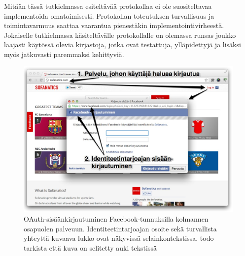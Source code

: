 \documentclass[finnish,gradu]{tktltiki}
\begin{document}












  Mitään tässä tutkielmassa esiteltävää protokollaa ei ole suositeltavaa implementoida omatoimisesti. Protokollan toteutuksen turvallisuus ja toimintavarmuus saattaa vaarantua pienestäkin implementointivirheestä. Jokaiselle tutkielmassa käsiteltävälle protokollalle on olemassa runsas joukko laajasti käytössä olevia kirjastoja, jotka ovat testattuja, ylläpidettyjä ja lisäksi myös jatkuvasti paremmaksi kehittyviä.

  \begin{figure}
    \centering
    \includegraphics[width=1.0\textwidth]{images/facebook_popup_login.jpg}
    \caption{OAuth-sisäänkirjautuminen Facebook-tunnuksilla kolmannen osapuolen palveuun. Identiteetintarjoajan osoite sekä turvallista yhteyttä kuvaava lukko ovat näkyvissä selainkontekstissa. todo tarkista että kuva on selitetty auki tekstissä}
    \label{fig:facebook_oauth_login}
  \end{figure}
\end{document}

